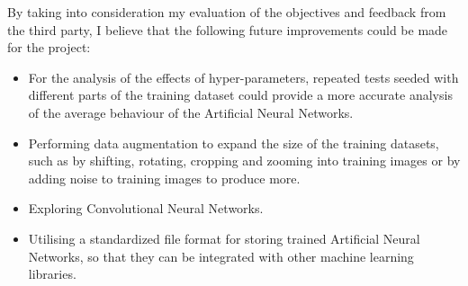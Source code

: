 \documentclass[./project-report/src/latex/project-report.tex]{subfiles}
\begin{document}
By taking into consideration my evaluation of the objectives and feedback from the third party, I believe that the following future improvements could be made for the 
project:

\begin{itemize}
    \item For the analysis of the effects of hyper-parameters, repeated tests seeded with different parts of the training dataset could provide a more accurate 
          analysis of the average behaviour of the Artificial Neural Networks.
    \item Performing data augmentation to expand the size of the training datasets, such as by shifting, rotating, cropping and zooming into training images or by 
          adding noise to training images to produce more.
    \item Exploring Convolutional Neural Networks.
    \item Utilising a standardized file format for storing trained Artificial Neural Networks, so that they can be integrated with other machine learning libraries.
\end{itemize}
\end{document}
